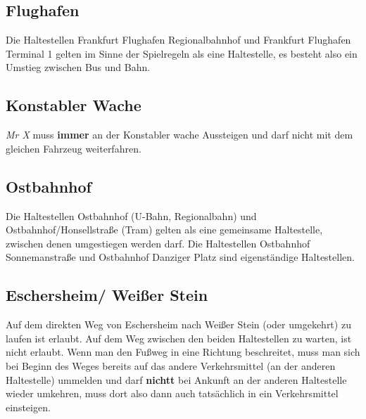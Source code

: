 \documentclass[12pt,a4paper]{article}
\begin{document}
\subsection{Flughafen}
Die Haltestellen Frankfurt Flughafen Regionalbahnhof und Frankfurt Flughafen Terminal 1 gelten im Sinne der Spielregeln als eine Haltestelle, es besteht also ein Umstieg zwischen Bus und Bahn.

\subsection{Konstabler Wache}
\textit{Mr X} muss \textbf{immer} an der Konstabler wache Aussteigen und darf nicht mit dem gleichen Fahrzeug weiterfahren.

\subsection{Ostbahnhof}
Die Haltestellen Ostbahnhof (U-Bahn, Regionalbahn) und Ostbahnhof/Honsellstraße (Tram) gelten als eine gemeinsame Haltestelle, zwischen denen umgestiegen werden darf.
Die Haltestellen Ostbahnhof Sonnemanstraße und Ostbahnhof Danziger Platz sind eigenständige Haltestellen.

\subsection{Eschersheim/ Weißer Stein}
Auf dem direkten Weg von Eschersheim nach Weißer Stein (oder umgekehrt) zu laufen ist erlaubt. 
Auf dem Weg zwischen den beiden Haltestellen zu warten, ist nicht erlaubt.
Wenn man den Fußweg in eine Richtung beschreitet, muss man sich bei Beginn des Weges bereits auf das andere Verkehrsmittel (an der anderen Haltestelle) ummelden und darf \textbf{nichtt} bei Ankunft an der anderen Haltestelle wieder umkehren, muss dort also dann auch tatsächlich in ein Verkehrsmittel einsteigen.
\end{document}
